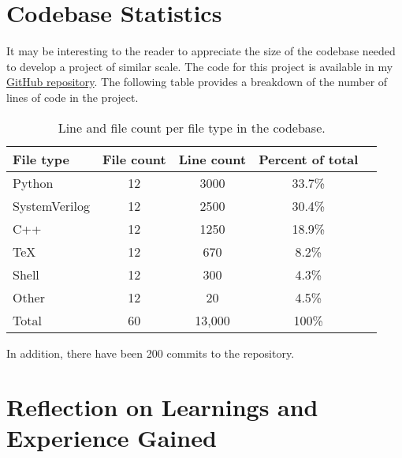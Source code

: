 \appendix
\section{Codebase Statistics}
It may be interesting to the reader to appreciate the size of the codebase needed to develop a project of similar scale. The code for this project is available 
in my \href{https://github.com/TristanRobitaille/engsci-thesis}{GitHub repository}. The following table provides a breakdown of the number of lines of code in the project.

\begin{table}[ht]
    \centering
    \renewcommand{\arraystretch}{1.2} %
    \setlength{\arrayrulewidth}{1.5pt} %
    \caption{Line and file count per file type in the codebase.}
    \begin{tabular}{@{} p{4cm}cccr @{}}
        \toprule
        File type       & File count    & Line count    & Percent of total & \\\midrule
        Python          & 12            & 3000          & 33.7\% \\
        SystemVerilog   & 12            & 2500          & 30.4\% \\
        C++             & 12            & 1250          & 18.9\% \\
        TeX             & 12            & 670           & 8.2\%  \\
        Shell           & 12            & 300           & 4.3\%  \\
        Other           & 12            & 20            & 4.5\%  \\\midrule
        Total           & 60            & 13,000         & 100\%  \\
        \hline
    \end{tabular}
    \label{tab:line_cnt}
\end{table}

In addition, there have been 200 commits to the repository.

\newpage
\section{Reflection on Learnings and Experience Gained}